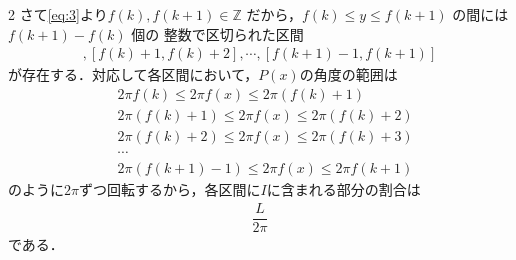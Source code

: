 \documentclass[../../main.tex]{subfiles}
\begin{document}
\begin{multicols}{2}
  さて\cref{eq:3}より$f(k), f(k+1) \in \mathbb{Z}$ だから，$f(k) \le y \le f(k+1)$ の間には $f(k+1)-f(k)$ 個の
  整数で区切られた区間
  \begin{align}
    [f(k),f(k)+1], [f(k)+1,f(k)+2], \cdots, [f(k+1)-1,f(k+1)]
  \end{align}
  が存在する．対応して各区間において，$P(x)$の角度の範囲は
  \begin{align}
    & 2\pi f(k)     \le 2\pi f(x) \le 2\pi (f(k)+1) \\
    & 2\pi (f(k)+1) \le 2\pi f(x) \le 2\pi (f(k)+2) \\
    & 2\pi (f(k)+2) \le 2\pi f(x) \le 2\pi (f(k)+3) \\
    & \cdots                                        \\
    & 2\pi (f(k+1)-1) \le 2\pi f(x) \le 2\pi f(k+1)
  \end{align}
  のように$2\pi$ずつ回転するから，各区間に$I$に含まれる部分の割合は
  \begin{align}
    \dfrac{L}{2\pi} \label{eq:5}
  \end{align}
  である．

  \begin{figure}[H]
    \centering
\end{figure}
\end{multicols}
\end{document}
